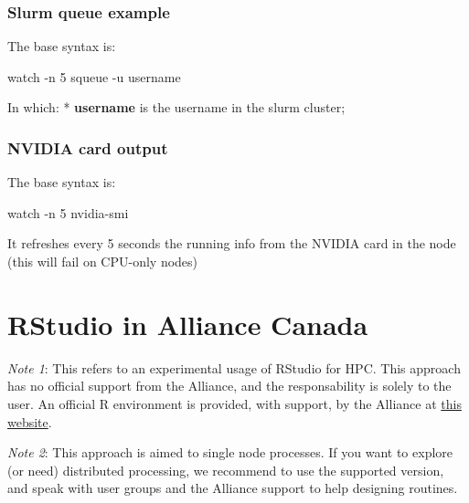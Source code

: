 \documentclass[
]{book}
\newenvironment{Shaded}{\begin{snugshade}}{\end{snugshade}}
\newcommand{\AttributeTok}[1]{\textcolor[rgb]{0.77,0.63,0.00}{#1}}
\newcommand{\ExtensionTok}[1]{#1}
\newcommand{\NormalTok}[1]{#1}
\begin{document}
\hypertarget{slurm-queue-example}{%
\subsection{Slurm queue example}\label{slurm-queue-example}}

The base syntax is:

\begin{Shaded}
\begin{Highlighting}[]
\ExtensionTok{watch} \AttributeTok{{-}n}\NormalTok{ 5 squeue }\AttributeTok{{-}u}\NormalTok{ username}
\end{Highlighting}
\end{Shaded}

In which:
* \textbf{username} is the username in the slurm cluster;

\hypertarget{nvidia-card-output}{%
\subsection{NVIDIA card output}\label{nvidia-card-output}}

The base syntax is:

\begin{Shaded}
\begin{Highlighting}[]
\ExtensionTok{watch} \AttributeTok{{-}n}\NormalTok{ 5 nvidia{-}smi}
\end{Highlighting}
\end{Shaded}

It refreshes every 5 seconds the running info from the NVIDIA card in the node (this will fail on CPU-only nodes)

\hypertarget{rstudio-in-alliance-canada}{%
\chapter{RStudio in Alliance Canada}\label{rstudio-in-alliance-canada}}

\emph{Note 1}: This refers to an experimental usage of RStudio for HPC. This approach
has no official support from the Alliance, and the responsability is solely to
the user. An official R environment is provided, with support, by the Alliance at
\href{https://docs.alliancecan.ca/wiki/Technical_documentation}{this website}.

\emph{Note 2}: This approach is aimed to single node processes. If you want to
explore (or need) distributed processing, we recommend to use the supported
version, and speak with user groups and the Alliance support to help designing routines.
\end{document}
